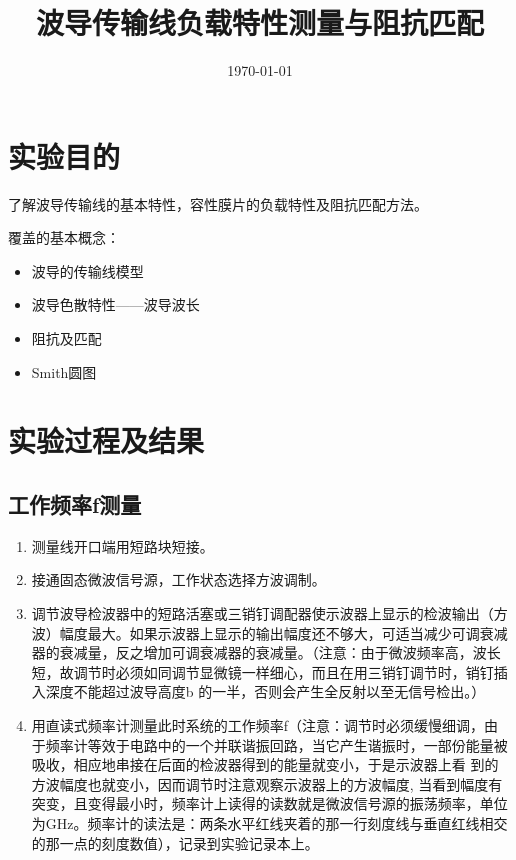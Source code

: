 \documentclass{../source/Experiment}
\title{波导传输线负载特性测量与阻抗匹配}
\date{\today}
\begin{document}
    \makecover
    \makeheader

    \section{实验目的}
    了解波导传输线的基本特性，容性膜片的负载特性及阻抗匹配方法。
    
    覆盖的基本概念：
    \begin{itemize}
        \item 波导的传输线模型
        \item 波导色散特性——波导波长
        \item 阻抗及匹配
        \item Smith圆图
    \end{itemize}

    \section{实验过程及结果}

        \subsection{工作频率ƒ测量}
            \begin{enumerate}
                \item 测量线开口端用短路块短接。
                \item 接通固态微波信号源，工作状态选择方波调制。
                \item 调节波导检波器中的短路活塞或三销钉调配器使示波器上显示的检波输出（方波）幅度最大。如果示波器上显示的输出幅度还不够大，可适当减少可调衰减器的衰减量，反之增加可调衰减器的衰减量。（注意：由于微波频率高，波长短，故调节时必须如同调节显微镜一样细心，而且在用三销钉调节时，销钉插入深度不能超过波导高度b 的一半，否则会产生全反射以至无信号检出。）
                \item 用直读式频率计测量此时系统的工作频率ƒ（注意：调节时必须缓慢细调，由于频率计等效于电路中的一个并联谐振回路，当它产生谐振时，一部份能量被吸收，相应地串接在后面的检波器得到的能量就变小，于是示波器上看 到的方波幅度也就变小，因而调节时注意观察示波器上的方波幅度, 当看到幅度有突变，且变得最小时，频率计上读得的读数就是微波信号源的振荡频率，单位为GHz。频率计的读法是：两条水平红线夹着的那一行刻度线与垂直红线相交的那一点的刻度数值），记录到实验记录本上。
            \end{enumerate}
\end{document}

